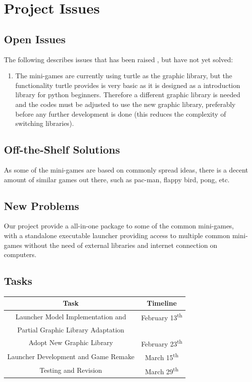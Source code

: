 \documentclass[12pt, titlepage]{article}
\begin{document}
\section{Project Issues}

\subsection{Open Issues}

The following describes issues that has been raised , but have not yet solved:
\begin{enumerate}
    \item The mini-games are currently using turtle as the graphic library, but the functionality turtle provides is very basic as it is designed as a introduction library for python beginners. Therefore a different graphic library is needed and the codes must be adjusted to use the new graphic library, preferably before any further development is done (this reduces the complexity of switching libraries).
\end{enumerate}

\subsection{Off-the-Shelf Solutions}

As some of the mini-games are based on commonly spread ideas, there is a decent amount of similar games out there, such as pac-man, flappy bird, pong, etc.

\subsection{New Problems}

Our project provide a all-in-one package to some of the common mini-games, with a standalone executable launcher providing access to multiple common mini-games without the need of external libraries and internet connection on computers.

\subsection{Tasks}

\begin{center}
\begin{tabular}{ |c|c| } 
\hline
\textbf{Task} & \textbf{Timeline}\\
\hline
Launcher Model Implementation and  & February 13\textsuperscript{th}\\
Partial Graphic Library Adaptation &\\
\hline
Adopt New Graphic Library & February 23\textsuperscript{th}\\
\hline
Launcher Development and Game Remake & March 15\textsuperscript{th}\\
\hline
Testing and Revision & March 29\textsuperscript{th}\\
\hline
\end{tabular}
\end{center}
\end{document}
